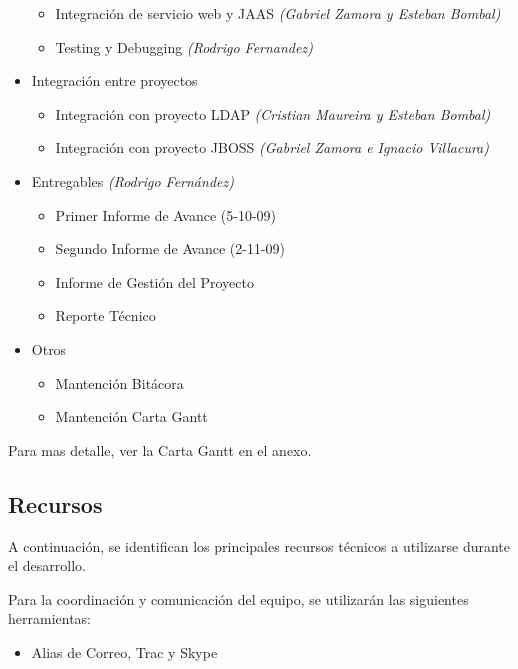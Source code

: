 \begin{itemize}
\begin{itemize}
	\item Integración de servicio web y JAAS \emph{(Gabriel Zamora y Esteban Bombal)}
	\item Testing y Debugging \emph{(Rodrigo Fernandez)}
\end{itemize} 
\item Integración entre proyectos 
\begin{itemize}
	\item Integración con proyecto LDAP \emph{(Cristian Maureira y Esteban Bombal)}
	\item Integración con proyecto JBOSS \emph{(Gabriel Zamora e Ignacio Villacura)}
\end{itemize}
\item Entregables \emph{(Rodrigo Fernández)}
\begin{itemize}
	\item Primer Informe de Avance (5-10-09) 
	\item Segundo Informe de Avance (2-11-09) 
	\item Informe de Gestión del Proyecto 
	\item Reporte Técnico
\end{itemize} 
\item Otros 
\begin{itemize}
	\item Mantención Bitácora 
	\item Mantención Carta Gantt 
\end{itemize}
\end{itemize}


Para mas detalle, ver la Carta Gantt en el anexo.\\


\subsection{Recursos}

A continuación, se identifican los principales recursos técnicos a utilizarse durante el desarrollo.

Para la coordinación y comunicación del equipo, se utilizarán las siguientes herramientas:

\begin{itemize}
    \item Alias de Correo, Trac y Skype
\end{itemize}


